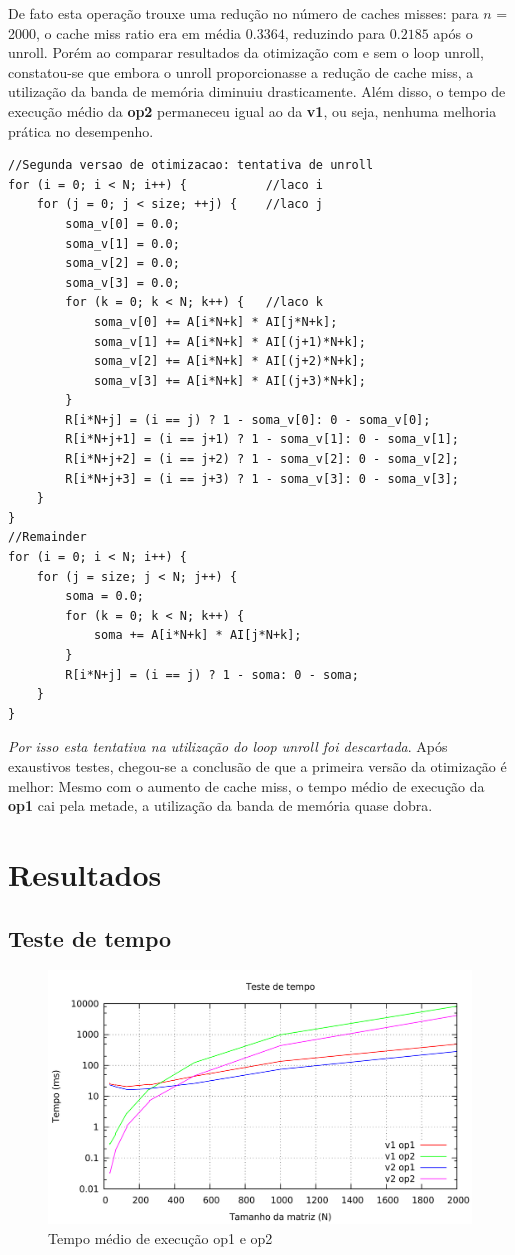 \documentclass[12pt]{article}
\begin{document}
De fato esta operação trouxe uma redução no número de caches misses: para $n$ = 2000, o cache miss ratio era em média $0.3364$, reduzindo para $0.2185$ após o unroll. Porém ao comparar resultados da otimização com e sem o loop unroll, constatou-se que embora o unroll proporcionasse a redução de cache miss, a utilização da banda de memória diminuiu drasticamente. Além disso, o tempo de execução médio da \textbf{op2} permaneceu igual ao da \textbf{v1}, ou seja, nenhuma melhoria prática no desempenho.
\begin{lstlisting}
//Segunda versao de otimizacao: tentativa de unroll
for (i = 0; i < N; i++) {           //laco i
	for (j = 0; j < size; ++j) {    //laco j
		soma_v[0] = 0.0;
		soma_v[1] = 0.0;
		soma_v[2] = 0.0;
		soma_v[3] = 0.0;
		for (k = 0; k < N; k++) {   //laco k
			soma_v[0] += A[i*N+k] * AI[j*N+k];
			soma_v[1] += A[i*N+k] * AI[(j+1)*N+k];
			soma_v[2] += A[i*N+k] * AI[(j+2)*N+k];
			soma_v[3] += A[i*N+k] * AI[(j+3)*N+k];
		}
		R[i*N+j] = (i == j) ? 1 - soma_v[0]: 0 - soma_v[0];
		R[i*N+j+1] = (i == j+1) ? 1 - soma_v[1]: 0 - soma_v[1];
		R[i*N+j+2] = (i == j+2) ? 1 - soma_v[2]: 0 - soma_v[2];
		R[i*N+j+3] = (i == j+3) ? 1 - soma_v[3]: 0 - soma_v[3];
	}
}
//Remainder
for (i = 0; i < N; i++) {
	for (j = size; j < N; j++) {
		soma = 0.0;
		for (k = 0; k < N; k++) {
			soma += A[i*N+k] * AI[j*N+k];
		}
		R[i*N+j] = (i == j) ? 1 - soma: 0 - soma;
	}
}
\end{lstlisting}
\emph{Por isso esta tentativa na utilização do loop unroll foi descartada}. Após exaustivos testes, chegou-se a conclusão de que a primeira versão da otimização é melhor: Mesmo com o aumento de cache miss, o tempo médio de execução da \textbf{op1} cai pela metade, a utilização da banda de memória quase dobra.


\section{Resultados}
\subsection{Teste de tempo}

\begin{figure}[H]
\centering
\includegraphics[width=1\textwidth]{img/time.png}
\caption{Tempo médio de execução op1 e op2}
\end{figure}
\end{document}
